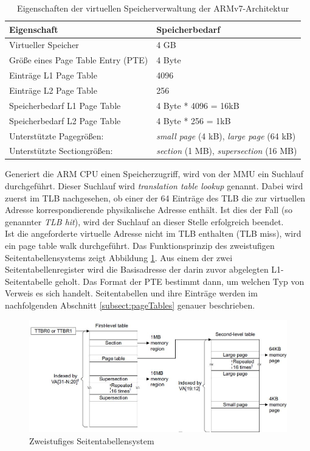 \begin{table}[H]
\begin{tabular}{p{7cm} | p{7cm}}
  \textbf{Eigenschaft} & \textbf{Speicherbedarf} \\ \hline
  Virtueller Speicher & 4 GB\\  
  Größe eines Page Table Entry (PTE) & 4 Byte \\
  Einträge L1 Page Table & 4096\\
  Einträge L2 Page Table & 256\\
  Speicherbedarf L1 Page Table & 4 Byte * 4096 = 16kB \\
  Speicherbedarf L2 Page Table & 4 Byte * 256 = 1kB\\
  Unterstützte Pagegrößen: & \emph{small page} (4 kB), \emph{large page} (64 kB)\\
  Unterstützte Sectiongrößen: & \emph{section} (1 MB), \emph{supersection} (16 MB)\\
 \end{tabular}
 \caption{Eigenschaften der virtuellen Speicherverwaltung der ARMv7-Architektur}
 \label{table:GeneralVirtualMemory}
\end{table}

Generiert die ARM CPU einen Speicherzugriff, wird von der MMU ein Suchlauf durchgeführt. Dieser Suchlauf wird \emph{translation table lookup} genannt. Dabei wird zuerst im \ac{TLB} nachgesehen, ob einer der 64 Einträge des TLB die zur virtuellen Adresse korrespondierende physikalische Adresse enthält. Ist dies der Fall (so genannter \emph{TLB hit}), wird der Suchlauf an dieser Stelle erfolgreich beendet.\\

Ist die angeforderte virtuelle Adresse nicht im TLB enthalten (TLB miss), wird ein page table walk durchgeführt. Das Funktionsprinzip des zweistufigen Seitentabellensystems zeigt Abbildung \ref{fig:2levelTableSystem}. Aus einem der zwei Seitentabellenregister wird die Basisadresse der darin zuvor abgelegten L1-Seitentabelle geholt. Das Format der PTE bestimmt dann, um welchen Typ von Verweis es sich handelt. Seitentabellen und ihre Einträge werden im nachfolgenden Abschnitt \ref{subsect:pageTables} genauer beschrieben.\\

\begin{figure}[H]
	\includegraphics[scale=0.7]{chapters/mmu/figures/addressTranslation}
	\caption{Zweistufiges Seitentabellensystem \cite[S. B3-1325]{ARM:ARM}}
	\label{fig:2levelTableSystem}
\end{figure}


